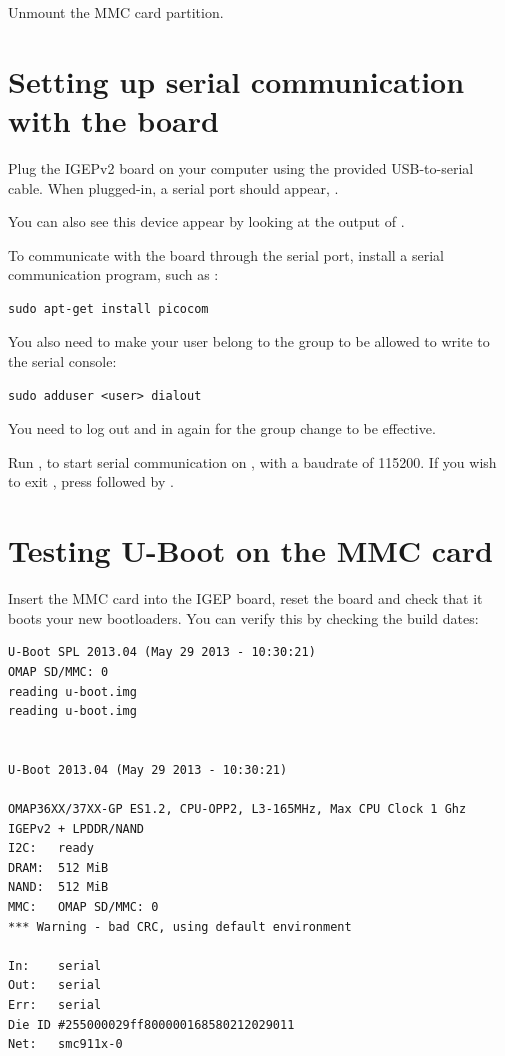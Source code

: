 Unmount the MMC card partition.

\section{Setting up serial communication with the board}

Plug the IGEPv2 board on your computer using the provided
USB-to-serial cable. When plugged-in, a serial port should appear,
.

You can also see this device appear by looking at the output of
.

To communicate with the board through the serial port, install a
serial communication program, such as :

\begin{verbatim}
sudo apt-get install picocom
\end{verbatim}

You also need to make your user belong to the  group to be
allowed to write to the serial console:

\begin{verbatim}
sudo adduser <user> dialout
\end{verbatim}

You need to log out and in again for the group change to be effective.

Run , to start serial
communication on , with a baudrate of 115200. If
you wish to exit , press \code{[Ctrl][a]} followed by
\code{[Ctrl][x]}.

\section{Testing U-Boot on the MMC card}

Insert the MMC card into the IGEP board, reset the board and check
that it boots your new bootloaders. You can verify this by checking
the build dates:

\begin{verbatim}
U-Boot SPL 2013.04 (May 29 2013 - 10:30:21)
OMAP SD/MMC: 0
reading u-boot.img
reading u-boot.img


U-Boot 2013.04 (May 29 2013 - 10:30:21)

OMAP36XX/37XX-GP ES1.2, CPU-OPP2, L3-165MHz, Max CPU Clock 1 Ghz
IGEPv2 + LPDDR/NAND
I2C:   ready
DRAM:  512 MiB
NAND:  512 MiB
MMC:   OMAP SD/MMC: 0
*** Warning - bad CRC, using default environment

In:    serial
Out:   serial
Err:   serial
Die ID #255000029ff800000168580212029011
Net:   smc911x-0
\end{verbatim}

